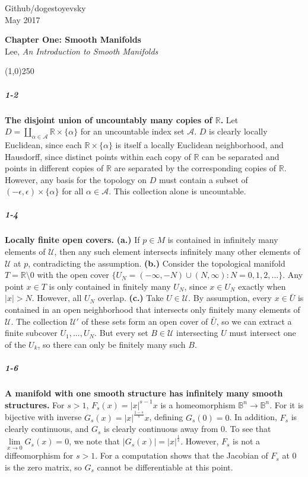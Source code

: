 \documentclass[10pt,letter]{article}
\begin{document}
\noindent Github/dogestoyevsky \\
May 2017
\begin{center}
\textbf{Chapter One: Smooth Manifolds}\\ Lee, \textit{An Introduction to Smooth Manifolds}

\line(1,0){250}
\end{center}

\subparagraph{1-2} \textbf{The disjoint union of uncountably many copies of $\mathbb{R}$.} Let $D = \coprod \limits_{\alpha \in \mathcal{A}} \mathbb{R} \times \lbrace \alpha \rbrace$ for an uncountable index set $\mathcal{A}$. $D$ is clearly locally Euclidean, since each $\mathbb{R} \times \lbrace \alpha \rbrace$ is itself a locally Euclidean neighborhood, and Hausdorff, since distinct points within each copy of $\mathbb{R}$ can be separated and points in different copies of $\mathbb{R}$ are separated by the corresponding copies of $\mathbb{R}$. However, any basis for the topology on $D$ must contain a subset of $(-\epsilon,\epsilon) \times \lbrace \alpha \rbrace$ for all $\alpha \in \mathcal{A}$. This collection alone is uncountable. 

\subparagraph{1-4} \textbf{Locally finite open covers.} \textbf{(a.)} If $p \in M$ is contained in infinitely many elements of $\mathcal{U}$, then any such element intersects infinitely many other elements of $\mathcal{U}$ at $p$, contradicting the assumption. \textbf{(b.)} Consider the topological manifold $T = \mathbb{R} \setminus 0$ with the open cover $\lbrace U_N = (-\infty,-N) \cup (N,\infty): N = 0,1,2,... \rbrace$. Any point $x \in T$ is only contained in finitely many $U_N$, since $x \in U_N$ exactly when $\vert x \vert > N$. However, all $U_N$ overlap. \textbf{(c.)}  Take $U \in \mathcal{U}$. By assumption, every $x \in \bar{U}$ is contained in an open neighborhood that intersects only finitely many elements of $\mathcal{U}$. The collection $\mathcal{U}'$ of these sets form an open cover of $\bar{U}$, so we can extract a finite subcover $U_1,...,U_N$. But every set $B \in \mathcal{U}$ intersecting $U$ must intersect one of the $U_k$, so there can only be finitely many such $B$.

\subparagraph{1-6} \textbf{A manifold with one smooth structure has infinitely many smooth structures.} For $s > 1$, $F_s(x) = \vert x \vert^{s-1}x$ is a homeomorphism $\mathbb{B}^n \rightarrow \mathbb{B}^n$. For it is bijective with inverse $G_s(x) = \vert x \vert^{\frac{1-s}{s}} x$, defining $G_s(0) = 0$. In addition, $F_s$ is clearly continuous, and $G_s$ is clearly continuous away from $0$. To see that $\lim \limits_{x \rightarrow 0} G_s(x) = 0$, we note that $\vert G_s(x) \vert = \vert x \vert^{\frac{1}{s}}$. However, $F_s$ is not a diffeomorphism for $s > 1$. For a computation shows that the Jacobian of $F_s$ at $0$ is the zero matrix, so $G_s$ cannot be differentiable at this point.
\end{document}
